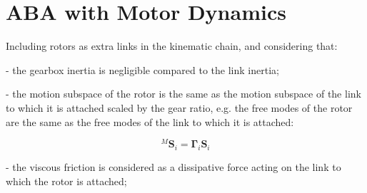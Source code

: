 \section{ABA with Motor Dynamics}

Including rotors as extra links in the kinematic chain, and considering that:

- the gearbox inertia is negligible compared to the link inertia;

- the motion subspace of the rotor is the same as the motion subspace of the link to which it is attached scaled by the gear ratio, e.g. the free modes of the rotor are the same as the free modes of the link to which it is attached:

\begin{equation}
    {} ^M \mathbf{S} _i = \boldsymbol{\Gamma} _i \mathbf{S} _i
\end{equation}

- the viscous friction is considered as a dissipative force acting on the link to which the rotor is attached;

